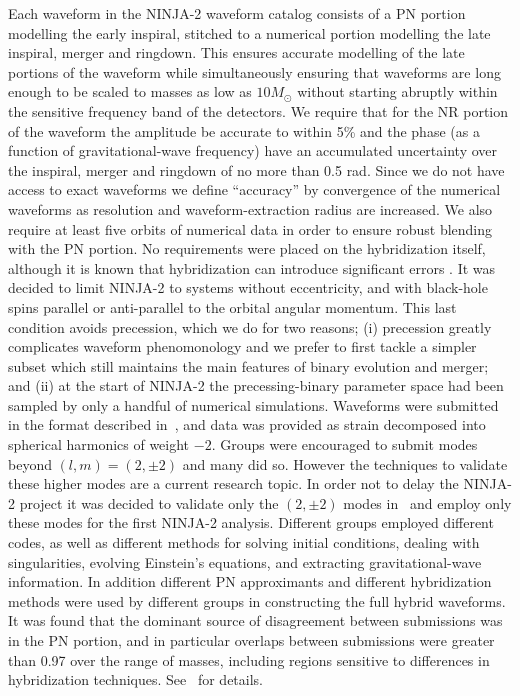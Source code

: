 Each waveform in the NINJA-2 waveform catalog consists of a PN 
portion modelling the early
inspiral, stitched to a numerical portion modelling the late inspiral,
merger and ringdown.  This ensures accurate modelling of the late
portions of the waveform while simultaneously ensuring that waveforms
are long enough to be scaled to masses as low as $10 M_\odot$ without
starting abruptly within the sensitive frequency band of the
detectors.  We require that for the NR portion of the waveform the
amplitude be accurate to within 5\% 
and the phase (as a function of gravitational-wave frequency)
have an accumulated uncertainty over the inspiral, merger and ringdown
of no more than 0.5 rad.  Since we do not have access to exact
waveforms we define ``accuracy'' by convergence of the numerical
waveforms as resolution and waveform-extraction radius are increased.
We also require at least five orbits of numerical data in order to
ensure robust blending with the PN portion.  No requirements were
placed on the hybridization itself, although it is known that
hybridization can introduce significant errors
\cite{MacDonald:2011ne, Santamaria:2010yb, Ohme:2011rm}.
It was
decided to limit NINJA-2 to systems without eccentricity, and with
black-hole spins parallel or anti-parallel
to the orbital angular momentum.  This
last condition avoids precession, which we do for two reasons; (i)
precession greatly complicates waveform phenomonology
and we prefer to first tackle a simpler subset which still maintains
the main features of binary evolution and merger; and (ii) at the
start of NINJA-2 the precessing-binary parameter space had been
sampled by only a handful of numerical simulations.  Waveforms were
submitted in the format described in~\cite{Brown:2007jx}, and data was
provided as strain decomposed into spherical harmonics of weight $-2$.
Groups were encouraged to submit modes beyond $(l,m)=(2,\pm 2)$
and many 
did so.  However the techniques to validate these higher modes
are a current research topic.  In order not to delay the NINJA-2
project it was decided to validate only the $(2,\pm 2)$ modes 
in~\cite{Ajith:2012az} and employ only these modes for the first
NINJA-2 analysis. Different groups employed different codes, as well
as different methods for solving initial conditions, dealing with
singularities, evolving Einstein's equations, and extracting
gravitational-wave information.  In addition different PN
approximants and different hybridization methods were used by
different groups in constructing the full hybrid waveforms. 
It was found that the
dominant source of disagreement between submissions was in the PN
portion, and in particular overlaps between submissions were greater
than 0.97 over the range of
masses, including regions sensitive to differences in hybridization
techniques. See~\cite{Ajith:2012az} for details.

